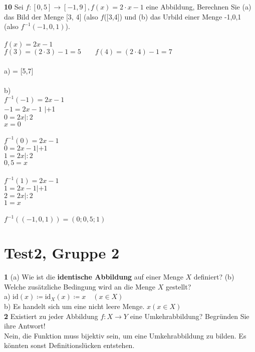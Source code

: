 \documentclass[11pt]{article}
\begin{document}
{{    \textbf{10} Sei $f : [0,5] \rightarrow [-1,9], f(x) = 2 \cdot x - 1$ eine Abbildung, Berechnen Sie (a) das Bild der Menge [3, 4] (also $f$([3,4]) und (b) das Urbild einer Menge {-1,0,1} (also $f^{-1}({-1,0,1})$).\\\\
    $f(x) = 2x - 1$ \\
    $f(3) = (2 \cdot 3) - 1 = 5 \quad \quad f(4) = (2 \cdot 4) - 1 = 7$ \\\\
    a)  = [5,7]\\\\
    b)\\$ f^{-1}(-1) = 2x-1$ \\ $ -1 = 2x - 1$ $|$+1\\$ 0 = 2x |:2$\\$x = 0$\\\\
    $ f^{-1}(0) = 2x-1$ \\ $ 0 = 2x - 1 |+1$\\ $ 1 = 2x |:2$\\$ 0,5 = x$\\\\
    $ f^{-1}(1) = 2x-1$ \\ $ 1 = 2x - 1 |+1$\\ $ 2 = 2x |:2$\\$1 = x$\\\\
    $f^{-1}((-1,0,1)) = (0;0,5;1)$

    \section{Test2, Gruppe 2}\label{sec:test2-gruppe-2}

    \textbf{1} (a) Wie ist die \textbf{identische Abbildung} auf einer Menge $X$ definiert? (b) Welche zusätzliche Bedingung wird an die Menge $X$ gestellt?\\
    a) $\text{id}(x) \coloneqq \text{id}_X(x) \coloneqq x \quad (x \in X)$\\
    b) Es handelt sich um eine nicht leere Menge. $x(x \in X)$\\

    \textbf{2} Existiert zu jeder Abbildung $f : X \rightarrow Y $ eine Umkehrabbildung? Begründen Sie ihre Antwort!\\
    Nein, die Funktion muss bijektiv sein, um eine Umkehrabbildung zu bilden. Es könnten sonst Definitionslücken entstehen.\\

}}
\end{document}
